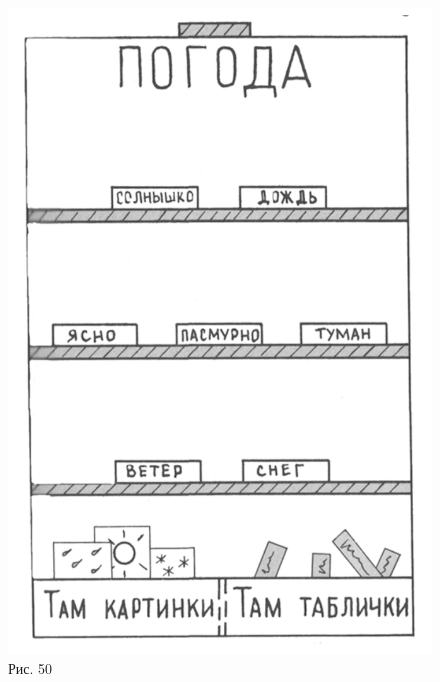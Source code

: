 \documentclass[a5paper]{book}
\begin{document}
\begin{figure}
\centering
\includegraphics[width=0.9\linewidth]{media/media/image46.png}
\caption*{Рис. 50}
\end{figure}
\end{document}
